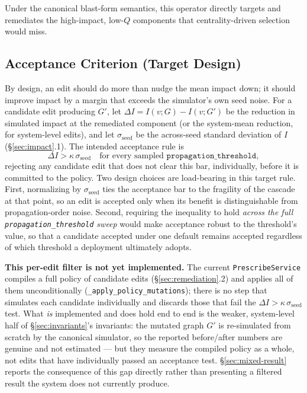 \documentclass[review]{elsarticle}
\begin{document}
Under the canonical blast-form semantics, this operator directly targets and remediates the
high-impact, low-$Q$ components that centrality-driven selection would miss.

\subsection{Acceptance Criterion (Target Design)}
\label{sec:acceptance}

By design, an edit should do more than nudge the mean impact down; it should improve impact by a
margin that exceeds the simulator's own seed noise. For a candidate edit producing $G'$, let $\Delta
I = I(v;G) - I(v;G')$ be the reduction in simulated impact at the remediated component (or the
system-mean reduction, for system-level edits), and let $\sigma_{\text{seed}}$ be the across-seed
standard deviation of $I$ (\S\ref{sec:impact}.1). The intended acceptance rule is
\begin{equation}
\Delta I > \kappa\,\sigma_{\text{seed}} \quad\text{for every sampled } \texttt{propagation\_threshold},
\end{equation}
rejecting any candidate edit that does not clear this bar, individually, before it is committed to
the policy. Two design choices are load-bearing in this target rule. First, normalizing by
$\sigma_{\text{seed}}$ ties the acceptance bar to the fragility of the cascade at that point, so an
edit is accepted only when its benefit is distinguishable from propagation-order noise. Second,
requiring the inequality to hold \emph{across the full \texttt{propagation\_threshold} sweep} would
make acceptance robust to the threshold's value, so that a candidate accepted under one default
remains accepted regardless of which threshold a deployment ultimately adopts.

\textbf{This per-edit filter is not yet implemented.} The current \texttt{PrescribeService} compiles
a full policy of candidate edits (\S\ref{sec:remediation}.2) and applies all of them unconditionally
(\texttt{\_apply\_policy\_mutations}); there is no step that simulates each candidate individually
and discards those that fail the $\Delta I > \kappa\,\sigma_{\text{seed}}$ test. What \emph{is}
implemented and does hold end to end is the weaker, system-level half of \S\ref{sec:invariants}'s
invariants: the mutated graph $G'$ is re-simulated from scratch by the canonical simulator, so the
reported before/after numbers are genuine and not estimated --- but they measure the compiled policy
as a whole, not edits that have individually passed an acceptance test. \S\ref{sec:mixed-result}
reports the consequence of this gap directly rather than presenting a filtered result the system does
not currently produce.
\end{document}
